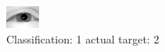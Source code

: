 \begin{figure}[h!]
\begin{center}
\includegraphics[width=0.60\columnwidth]{figures/ID2267_class_1_target_2.png}
\end{center}
\caption{ Classification: 1 actual target: 2}
\label{fig:ID2267_class_1_target_2}
\end{figure}
